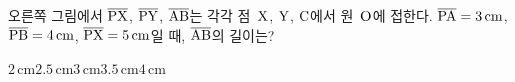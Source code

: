\noindent\begin{minipage}[t]{0.58\linewidth}\vspace{0pt}\raggedright 오른쪽 그림에서 $\overline{\mathrm{PX}}$, $\overline{\mathrm{PY}}$, $\overline{\mathrm{AB}}$는 각각 점~$\mathrm{X}$, $\mathrm{Y}$, $\mathrm{C}$에서 원~$\mathrm{O}$에 접한다. $\overline{\mathrm{PA}}=3\,\mathrm{cm}$, $\overline{\mathrm{PB}}=4\,\mathrm{cm}$, $\overline{\mathrm{PX}}=5\,\mathrm{cm}$일 때, $\overline{\mathrm{AB}}$의 길이는?\end{minipage}\hfill\begin{minipage}[t]{0.4\linewidth}\vspace{0pt}\centering \resizebox{\ifdim\width>\linewidth\linewidth\else\width\fi}{!}{}\end{minipage}\par
\begin{choices32}{$2\,\mathrm{cm}$}{$2.5\,\mathrm{cm}$}{$3\,\mathrm{cm}$}{$3.5\,\mathrm{cm}$}{$4\,\mathrm{cm}$}\end{choices32}
